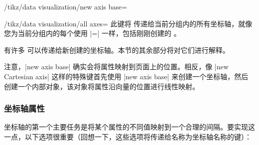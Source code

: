\begin{key}{/tikz/data visualization/new axis base=}
\begin{enumerate}
\begin{key}{/tikz/data visualization/all axes=}
                此键将  传递给当前分组内的所有坐标轴，就像您为当前分组内的每个使用 |=| 一样，包括刚刚创建的 。
            \end{key}
    \end{enumerate}
    有许多  可以传递给新创建的坐标轴。本节的其余部分将对它们进行解释。
\end{key}


注意，|new axis base| 确实会将属性映射到页面上的位置。相反，像 |new Cartesian axis| 这样的特殊键首先使用 |new axis base| 来创建一个坐标轴，然后创建一个内部对象，该对象将属性沿向量的位置进行线性映射。


\subsubsection{坐标轴属性}
\label{section-dv-axis-attribute}


坐标轴的第一个主要任务是将某个属性的不同值映射到一个合理的间隔。要实现这一点，以下选项很重要（回想一下，这些选项将传递给名称为坐标轴名称的键）：

